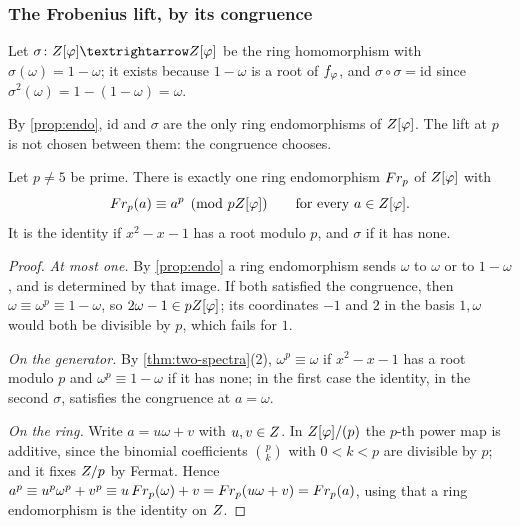 \subsubsection{The Frobenius lift, by its congruence}

\begin{definition}\label{def:sigma}
Let $\sigma\colon\Zphi\to\Zphi$ be the ring homomorphism with
$\sigma(\omega)=1-\omega$; it exists because $1-\omega$ is a root of
$f_\varphi$, and $\sigma\circ\sigma=\mathrm{id}$ since $\sigma^2(\omega)=1-(1-\omega)=\omega$.
\end{definition}

By \cref{prop:endo}, $\mathrm{id}$ and $\sigma$ are the only ring endomorphisms of $Z[\varphi]$.  The
lift at $p$ is not chosen between them: the congruence chooses.

\begin{theorem}\label{thm:frobenius-congruence}
Let $p\ne5$ be prime.  There is exactly one ring endomorphism $Fr_p$ of $Z[\varphi]$ with
\[
  Fr_p(a)\equiv a^p\pmod{pZ[\varphi]}\qquad\text{for every }a\in Z[\varphi] .
\]
It is the identity if $x^2-x-1$ has a root modulo $p$, and $\sigma$ if it has none.
\end{theorem}
\begin{proof}
\emph{At most one.}  By \cref{prop:endo} a ring endomorphism sends $\omega$ to $\omega$ or to
$1-\omega$, and is determined by that image.  If both satisfied the congruence, then
$\omega\equiv\omega^p\equiv1-\omega$, so $2\omega-1\in pZ[\varphi]$; its coordinates $-1$ and $2$ in the
basis $1,\omega$ would both be divisible by $p$, which fails for $1$.

\emph{On the generator.}  By \cref{thm:two-spectra}(2), $\omega^p\equiv\omega$ if $x^2-x-1$ has a
root modulo $p$ and $\omega^p\equiv1-\omega$ if it has none; in the first case the identity, in the
second $\sigma$, satisfies the congruence at $a=\omega$.

\emph{On the ring.}  Write $a=u\omega+v$ with $u,v\in Z$.  In
$Z[\varphi]/(p)$ the $p$-th power map is additive, since the binomial coefficients
$\binom pk$ with $0<k<p$ are divisible by $p$; and it fixes $Z/p$ by Fermat.
Hence
$a^p\equiv u^p\omega^p+v^p\equiv u\,Fr_p(\omega)+v=Fr_p(u\omega+v)=Fr_p(a)$,
using that a ring endomorphism is the identity on $Z$.
\end{proof}

